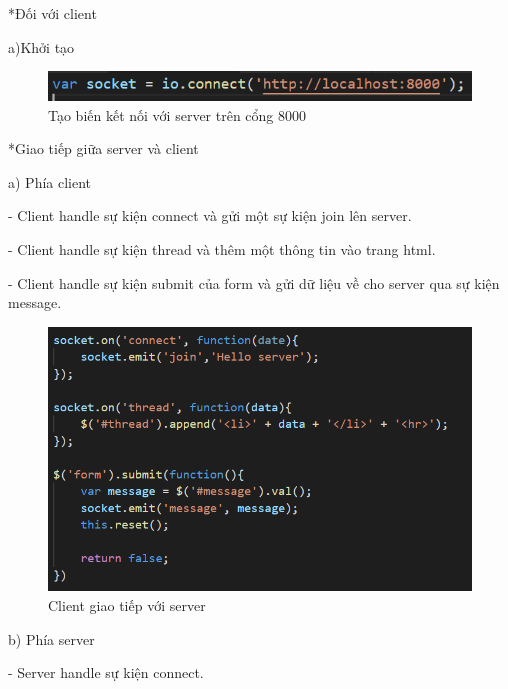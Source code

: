 \documentclass{report}
\begin{document}
\bigskip
*Đối với client

a)Khởi tạo
\begin{center}
    \begin{figure}[htp]
    \begin{center}
     \includegraphics[scale=1.2]{client.png}
    \end{center}
    \caption{Tạo biến kết nối với server trên cổng 8000}
    \label{refhinh1}
    \end{figure}
\end{center}

*Giao tiếp giữa server và client

a) Phía client

- Client handle sự kiện connect và gửi một sự kiện join lên server.

- Client handle sự kiện thread và thêm một thông tin vào trang html.

- Client handle sự kiện submit của form và gửi dữ liệu về cho server qua sự kiện message.


\begin{center}
    \begin{figure}[htp]
    \begin{center}
     \includegraphics[scale=1]{talk1.png}
    \end{center}
    \caption{Client giao tiếp với server}
    \label{refhinh1}
    \end{figure}
\end{center}

\newpage
b) Phía server

- Server handle sự kiện connect.
\end{document}

